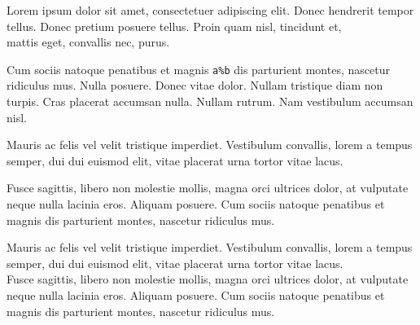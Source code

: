Lorem ipsum dolor sit amet, consectetuer adipiscing elit. Donec hendrerit
tempor tellus. Donec pretium posuere tellus. Proin quam nisl, tincidunt et,
 \\%
mattis eget, convallis nec, purus.

Cum sociis natoque penatibus et magnis \verb|a%b|
dis parturient montes, nascetur ridiculus mus. Nulla posuere. Donec vitae
dolor. Nullam tristique diam non turpis. 
Cras placerat accumsan nulla. Nullam rutrum. Nam vestibulum accumsan nisl.

Mauris ac felis vel velit tristique imperdiet.  Vestibulum convallis, lorem a tempus semper, dui dui euismod elit, vitae placerat urna tortor vitae lacus.\par 
 Fusce sagittis, libero non molestie mollis, magna orci ultrices dolor, at vulputate neque nulla lacinia eros.  Aliquam posuere.  Cum sociis natoque penatibus et magnis dis parturient montes, nascetur ridiculus mus.%

Mauris ac felis vel velit tristique imperdiet.  Vestibulum convallis, lorem a 
tempus semper, dui dui euismod elit, vitae placerat urna tortor vitae lacus.\\
  Fusce sagittis, libero non molestie mollis, magna orci ultrices dolor, at vulputate neque nulla lacinia eros.  Aliquam posuere.  Cum sociis natoque penatibus et magnis dis parturient montes, nascetur ridiculus mus.%
